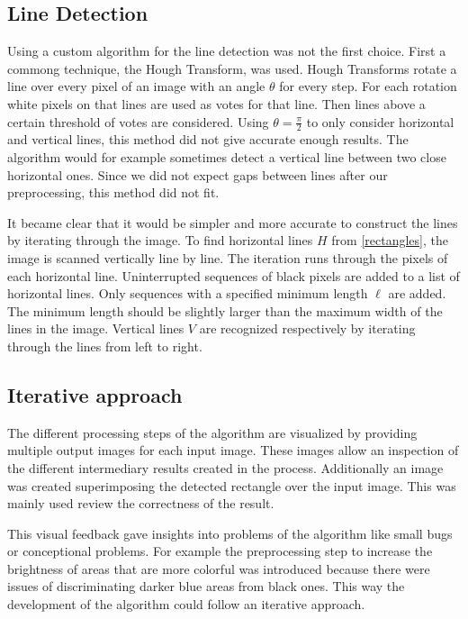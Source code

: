 \documentclass[serif,article,noparskip]{agse-thesis}
\begin{document}
\subsection{Line Detection}

Using a custom algorithm for the line detection was not the first choice. First
a commong technique, the Hough Transform, was used. Hough Transforms rotate a
line over every pixel of an image with an angle $\theta$ for every step. For
each rotation white pixels on that lines are used as votes for that line. Then
lines above a certain threshold of votes are considered. Using $\theta =
\frac{\pi}{2}$ to only consider horizontal and vertical lines, this method did
not give accurate enough results. The algorithm would for example sometimes
detect a vertical line between two close horizontal ones. Since we did not
expect gaps between lines after our preprocessing, this method did not fit.

It became clear that it would be simpler and more accurate to construct the
lines by iterating through the image. To find horizontal lines $H$ from
\ref{rectangles}, the image is scanned vertically line by line. The
iteration runs through the pixels of each horizontal line. Uninterrupted
sequences of black pixels are added to a list of horizontal lines. Only
sequences with a specified minimum length $\ell$ are added. The minimum length
should be slightly larger than the maximum width of the lines in the image.
Vertical lines $V$ are recognized respectively by iterating through the lines
from left to right.

\subsection{Iterative approach}

The different processing steps of the algorithm are visualized by providing
multiple output images for each input image. These images allow an inspection of
the different intermediary results created in the process. Additionally an image
was created superimposing the detected rectangle over the input image. This was
mainly used review the correctness of the result.

This visual feedback gave insights into problems of the algorithm like small
bugs or conceptional problems. For example the preprocessing step to increase
the brightness of areas that are more colorful was introduced because there were
issues of discriminating darker blue areas from black ones. This way the
development of the algorithm could follow an iterative approach.
\end{document}
